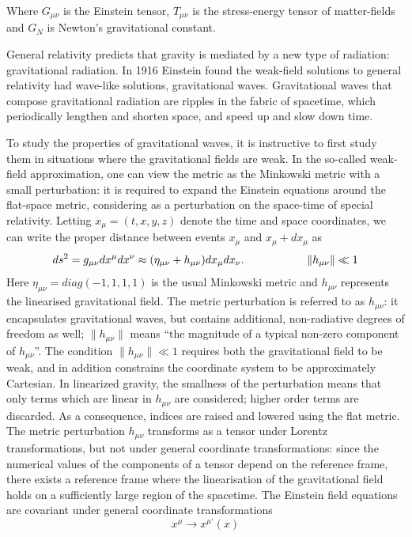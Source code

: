 \documentclass[binding=0.6cm, LaM]{sapthesis}
\begin{document}
Where $G_{\mu\nu} $ is the Einstein tensor, $T_{\mu\nu} $ is the stress-energy tensor of matter-fields and $ G_{N}$ is Newton’s gravitational constant. 

General relativity predicts that gravity is mediated by a new type of radiation: gravitational radiation. In 1916 Einstein found the weak-field solutions to general relativity had wave-like solutions, gravitational waves. 
Gravitational waves that compose gravitational radiation are ripples in the fabric of spacetime, which periodically lengthen and shorten space, and speed up and slow down time. 



 To study the properties of gravitational waves, it is instructive to first study them in situations where the gravitational fields are weak. In the so-called weak-field approximation, one can view the metric as the Minkowski metric with a small perturbation: it is required to expand the Einstein equations around the flat-space metric, considering as a perturbation on the space-time of special relativity. Letting $ x_\mu = (t, x, y, z)$ denote the time and space coordinates, we can write the proper distance between events $x_{\mu}$ and
$x_{\mu} + dx_{\mu}$ as
\[
ds^2 = g_{\mu\nu}dx^{\mu}dx^{\nu} \approx (\eta_{\mu\nu} + h_{\mu\nu})dx_{\mu}dx_{\nu}. \hspace*{2cm}\|h_{\mu\nu}\|\ll 1
\]
Here $\eta_{\mu\nu} = diag(-1,1,1,1)$ is the usual Minkowski metric and
 $h_{\mu\nu}$ represents the linearised gravitational field.
The metric perturbation is referred to as  $h_{\mu\nu}$: it encapsulates gravitational waves, but contains additional, non-radiative degrees of freedom as well; $\|h_{\mu\nu}\|$ means “the magnitude of a typical non-zero component of $h_{\mu\nu}$”. The condition $\|h_{\mu\nu}\|\ll 1$ requires both the gravitational field to be weak, and in addition constrains the coordinate system to be approximately Cartesian.  In linearized gravity, the smallness of the perturbation means that only terms which are linear in $h_{\mu\nu}$ are considered; higher order terms are discarded. As a consequence, indices are raised and lowered using the flat metric. The metric perturbation $h_{\mu\nu}$ transforms as a tensor under Lorentz transformations, but not under general coordinate transformations: since the numerical values of the components of a tensor depend on the reference frame, there exists a reference frame where the linearisation of the gravitational field holds on a sufficiently large region of the spacetime. 
The Einstein field equations are covariant under general coordinate transformations
\begin{equation}
x^{\mu} \rightarrow x^{\mu ‘}(x)
\end{equation}
\end{document}
